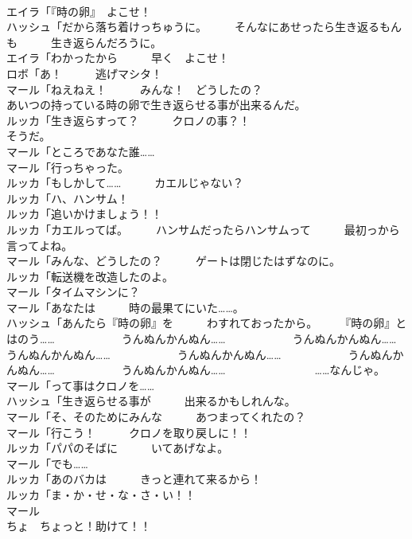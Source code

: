 \documentclass[8pt]{extreport}
\begin{document}
\begin{CJK}{UTF8}{min}
\\	エイラ「『時の卵』　よこせ！	
\\	ハッシュ「だから落ち着けっちゅうに。　　　そんなにあせったら生き返るもんも　　　生き返らんだろうに。	
\\	エイラ「わかったから　　　早く　よこせ！	
\\	ロボ「あ！　　　逃げマシタ！	
\\	マール「ねえねえ！　　　みんな！　どうしたの？	
\\	あいつの持っている時の卵で生き返らせる事が出来るんだ。	
\\	ルッカ「生き返らすって？　　　クロノの事？！	
\\	そうだ。	
\\	マール「ところであなた誰……	
\\	マール「行っちゃった。	
\\	ルッカ「もしかして……　　　カエルじゃない？	
\\	ルッカ「ハ、ハンサム！	
\\	ルッカ「追いかけましょう！！	
\\	ルッカ「カエルってば。　　　ハンサムだったらハンサムって　　　最初っから言ってよね。	
\\	マール「みんな、どうしたの？　　　ゲートは閉じたはずなのに。	
\\	ルッカ「転送機を改造したのよ。	
\\	マール「タイムマシンに？	
\\	マール「あなたは　　　時の最果てにいた……。	
\\	ハッシュ「あんたら『時の卵』を　　　わすれておったから。　　　『時の卵』とはのう……　　　　　　うんぬんかんぬん……　　　　　　うんぬんかんぬん……　　　　　　うんぬんかんぬん……　　　　　　うんぬんかんぬん……　　　　　　うんぬんかんぬん……　　　　　　うんぬんかんぬん……　　　　　　　　……なんじゃ。	
\\	マール「って事はクロノを……	
\\	ハッシュ「生き返らせる事が　　　出来るかもしれんな。	
\\	マール「そ、そのためにみんな　　　あつまってくれたの？	
\\	マール「行こう！　　　クロノを取り戻しに！！	
\\	ルッカ「パパのそばに　　　いてあげなよ。	
\\	マール「でも……	
\\	ルッカ「あのバカは　　　きっと連れて来るから！	
\\	ルッカ「ま・か・せ・な・さ・い！！	
\\	マール
\\	ちょ　ちょっと！助けて！！	

\end{CJK}
\end{document}
